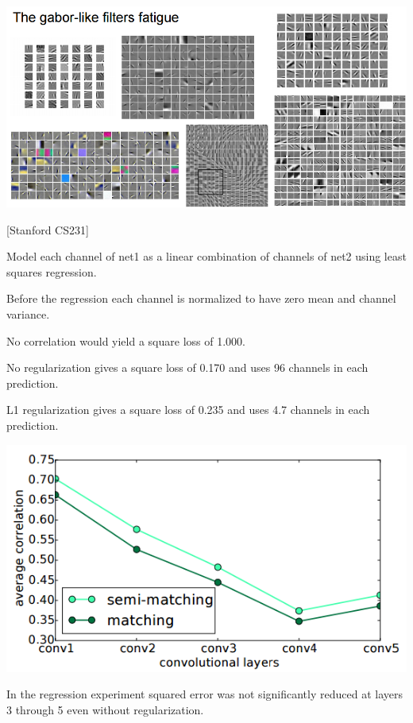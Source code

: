 {

\centerline{\includegraphics[width = 9.5in]{../images/Filters}}
\centerline{[Stanford CS231]}


Model each channel of net1 as a linear combination of channels of net2 using least squares regression.

\vfill
Before the regression each channel is normalized to have zero mean and channel variance.

\vfill
No correlation would yield a {\color{red} square loss of 1.000}.

\vfill
No regularization gives a {\color{red} square loss of 0.170} and uses {\color{red} 96 channels} in each prediction.

\vfill
L1 regularization gives a {\color{red} square loss of 0.235} and uses {\color{red} 4.7 channels} in each prediction.


\centerline{\includegraphics[width = 7.5in]{../images/Correlations4}}

\vfill
In the regression experiment squared error was not significantly reduced at layers 3 through 5 even without regularization. 

}
